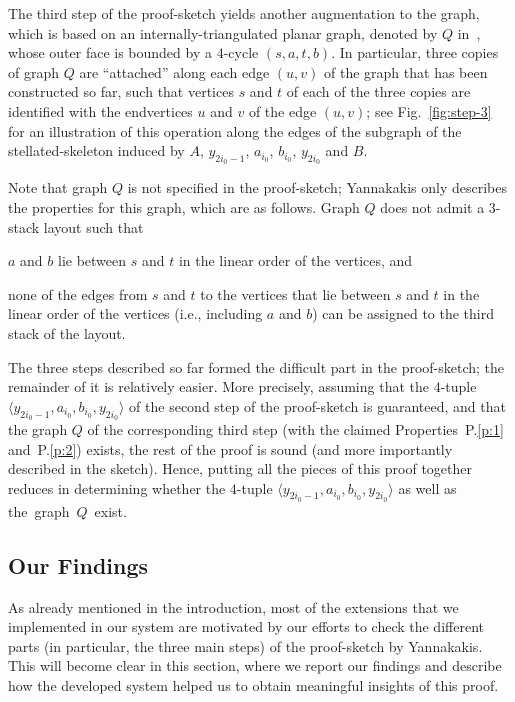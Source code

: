 \documentclass[runningheads]{llncs}
\begin{document}
The third step of the proof-sketch yields another augmentation to the graph, which is based on an internally-triangulated planar graph, denoted by $Q$ in~\cite{DBLP:conf/stoc/Yannakakis86}, whose outer face is bounded by a $4$-cycle $(s,a,t,b)$. In particular, three copies of graph $Q$ are ``attached'' along each edge $(u,v)$ of the graph that has been  constructed so far, such that vertices $s$ and $t$ of each of the three copies are identified with the endvertices $u$ and $v$ of the edge $(u,v)$; see Fig.~\ref{fig:step-3} for an illustration of this operation along the edges of the subgraph of the stellated-skeleton induced by $A$, $y_{2i_0-1}$, $a_{i_0}$, $b_{i_0}$, $y_{2i_0}$ and $B$. 

Note that graph $Q$ is not specified in the proof-sketch; Yannakakis only describes the properties for this graph, which are as follows. Graph $Q$ does not admit a $3$-stack layout such that 
\begin{inparaenum}[(P.1)]
\item \label{p:1} $a$ and $b$ lie between $s$ and $t$ in the linear order of the vertices, and 
\item \label{p:2} none of the edges from $s$ and $t$ to the vertices that lie between $s$ and $t$ in the linear order of the vertices (i.e., including $a$ and $b$) can be assigned to the third stack of the layout.
\end{inparaenum}

The three steps described so far formed the difficult part in the proof-sketch; the remainder of it is relatively easier. More precisely, assuming that the $4$-tuple $\langle y_{2i_0-1}, a_{i_0}, b_{i_0}, y_{2i_0}\rangle$ of the second step of the proof-sketch is guaranteed, and that the graph $Q$ of the corresponding third step (with the claimed Properties~P.\ref{p:1} and~P.\ref{p:2}) exists, the rest of the proof is sound (and more importantly described in the sketch). Hence, putting all the pieces of this proof together reduces in determining whether the $4$-tuple $\langle y_{2i_0-1}, a_{i_0}, b_{i_0}, y_{2i_0}\rangle$ as well as the~graph~$Q$~exist.


\subsection{Our Findings}
\label{subsec:findings}

As already mentioned in the introduction, most of the extensions that we implemented in our system are motivated by our efforts to check the different parts (in particular, the three main steps) of the proof-sketch by Yannakakis. This will become clear in this section, where we report our findings and describe how the developed system helped us to obtain meaningful insights of this proof. 
\end{document}
